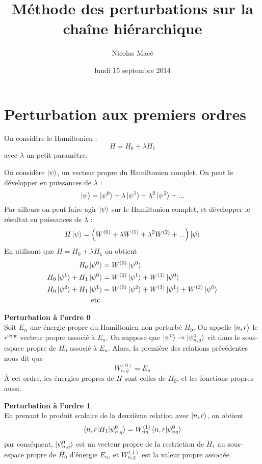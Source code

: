 \documentclass[11pt]{article}
\title{\textbf{Méthode des perturbations sur la chaîne hiérarchique}}
\author{Nicolas Macé}
\date{lundi 15 septembre 2014}
\begin{document}
\maketitle

\section{Perturbation aux premiers ordres}

On considère le Hamiltonien :
\begin{equation}
H = H_0 + \lambda H_1
\end{equation}
avec $\lambda$ un petit paramètre.

On considère $\ket{\psi}$, un vecteur propre du Hamiltonien complet.
On peut le développer en puissances de $\lambda$ :
\begin{equation}
	\ket{\psi} = \ket{\psi^0} + \lambda \ket{\psi^1} + \lambda^2 \ket{\psi^2} + ...
\end{equation}
Par ailleurs on peut faire agir $\ket{\psi}$ sur le Hamiltonien complet, et développer le résultat en puissances de $\lambda$ :
\begin{equation}
	H \ket{\psi} = \left( W^{(0)} + \lambda W^{(1)} + \lambda^2 W^{(2)} + ...  \right) \ket{\psi}
\end{equation}
En utilisant que $H = H_0 + \lambda H_1$ on obtient
\begin{align}
	H_0 \ket{\psi^0} &= W^{(0)} \ket{\psi^{0}} \\
	H_0 \ket{\psi^1} + H_1\ket{\psi^0} &= W^{(0)} \ket{\psi^{1}} + W^{(1)} \ket{\psi^0} \\
	H_0 \ket{\psi^2} + H_1\ket{\psi^1} &= W^{(0)} \ket{\psi^{2}} + W^{(1)} \ket{\psi^1} + W^{(2)} \ket{\psi^0} \\
\text{etc.}  
\end{align}

\textbf{Perturbation à l'ordre 0}\\
Soit $E_n$ une énergie propre du Hamiltonien non perturbé $H_0$. On appelle $\ket{n,r}$ le $r^\text{ième}$ vecteur propre associé à $E_n$. 
On suppose que $\ket{\psi^0} \rightarrow \ket{\psi^0_{n,q}}$ vit dans le sous-espace propre de $H_0$ associé à $E_n$.
Alors, la première des relations précédentes nous dit que 
\begin{equation}
	W^{(0)}_{n,q}  = E_n
\end{equation}
À cet ordre, les énergies propres de $H$ sont celles de $H_0$, et les fonctions propres aussi.

\textbf{Perturbation à l'ordre 1}\\
En prenant le produit scalaire de la deuxième relation avec $\ket{n,r}$, on obtient
\begin{equation}
\label{ordre1}
	\braket{ n,r | H_1| \psi^0_{n,q} } = W^{(1)}_{nq} \braket{ n,r | \psi^0_{nq} }
\end{equation}
par conséquent, $\ket{\psi^0_{n,q}}$ est un vecteur propre de la restriction de $H_1$ au sous-espace propre de $H_0$ d'énergie $E_n$, et $W^{(1)}_{n,q}$ est la valeur propre associée.
\end{document}
